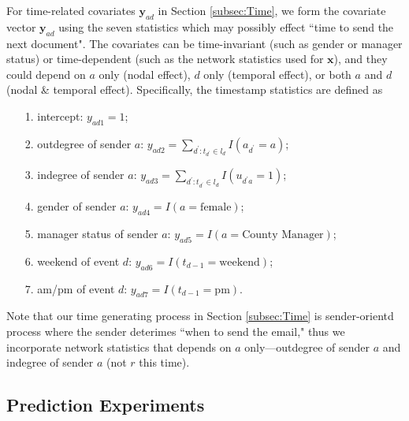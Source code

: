 \documentclass[ba]{imsart}
\numberwithin{equation}{section}
\theoremstyle{plain}
\begin{document}
 	   For time-related covariates $\boldsymbol{y}_{ad}$ in Section \ref{subsec:Time}, we form the covariate vector $\boldsymbol{y}_{ad}$ using the seven statistics which may possibly effect ``time to send the next document". The covariates can be time-invariant (such as gender or manager status) or time-dependent (such as the network statistics used for $\boldsymbol{x}$), and they could depend on $a$ only (nodal effect), $d$ only (temporal effect), or both $a$ and $d$ (nodal \& temporal effect). Specifically, the timestamp statistics are defined as
 	   \begin{itemize}
 	   	\item[1.] intercept: ${y}_{ad1} =1$;
 	   	\item[2.] outdegree of sender $a$: ${y}_{ad2} =\sum_{d^\prime: t_{d^\prime} \in l_d} I(a_{d^\prime} = a)$;
 	   	\item[3.] indegree of sender $a$: ${y}_{ad3}=\sum_{d^\prime: t_{d^\prime} \in l_d} I(u_{d^\prime a} = 1)$;
 	   	\item[4.] gender of sender $a$: ${y}_{ad4}=I(a= \mbox{female})$;
 	   	\item[5.] manager status of sender $a$: ${y}_{ad5}=I(a= \mbox{County Manager})$;
 	   	\item[6.] weekend of event $d$: ${y}_{ad6} = I(t_{d-1}= \mbox{weekend})$;
 	   	\item[7.] am/pm of event $d$: ${y}_{ad7}= I(t_{d-1}= \mbox{pm})$.
 	   \end{itemize}
 	   Note that our time generating process in Section \ref{subsec:Time} is sender-orientd process where the sender deterimes ``when to send the email," thus we incorporate network statistics that depends on $a$ only---outdegree of sender $a$ and indegree of sender $a$ (not $r$ this time).

	\subsection{Prediction Experiments}\label{subsec:Experiment_email}
	
\end{document}
